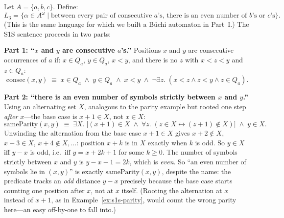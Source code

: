 \begin{example}
\label{ex:s1s-consecutive}
Let $A = \{a, b, c\}$.  Define:
\[
  L_3 = \{\alpha \in A^\omega \mid \text{between every pair of
          consecutive $a$'s, there is an even number of $b$'s or $c$'s}\}.
\]
(This is the same language for which we built a Büchi automaton in
Part~I.)  The S1S sentence proceeds in two parts:

\medskip\noindent
\textbf{Part 1: ``$x$ and $y$ are consecutive $a$'s.''} Positions $x$ and
$y$ are consecutive occurrences of $a$ if: $x \in Q_a$, $y \in Q_a$,
$x < y$, and there is no $z$ with $x < z < y$ and $z \in Q_a$:
\[
  \mathrm{consec}(x, y) \;\equiv\;
  x \in Q_a \;\land\; y \in Q_a \;\land\; x < y
  \;\land\; \neg\exists z.\;(x < z \land z < y \land z \in Q_a).
\]

\textbf{Part 2: ``there is an even number of symbols strictly between
$x$ and $y$.''} Using an alternating set $X$, analogous to the parity
example but rooted one step \emph{after} $x$---the base case is
$x+1 \in X$, not $x \in X$:
\[
  \mathrm{sameParity}(x, y) \;\equiv\;
  \exists X.\;\bigl[(x+1) \in X \;\land\;
    \forall z.\;(z \in X \leftrightarrow (z+1) \notin X)\bigr]
  \;\land\; y \in X.
\]
Unwinding the alternation from the base case $x+1 \in X$ gives
$x+2 \notin X$, $x+3 \in X$, $x+4 \notin X, \ldots$: position $x+k$
is in $X$ exactly when $k$ is odd.  So $y \in X$ iff $y - x$ is odd,
i.e.\ iff $y = x + 2k+1$ for some $k \geq 0$.  The number of symbols
strictly between $x$ and $y$ is $y - x - 1 = 2k$, which is
\emph{even}.  So ``an even number of symbols lie in $(x,y)$'' is
exactly $\mathrm{sameParity}(x,y)$, despite the name: the predicate
tracks an \emph{odd} distance $y - x$ precisely because the base case
starts counting one position after $x$, not at $x$ itself.  (Rooting
the alternation at $x$ instead of $x+1$, as in
Example~\ref{ex:s1s-parity}, would count the wrong parity here---an
easy off-by-one to fall into.)


\end{example}
